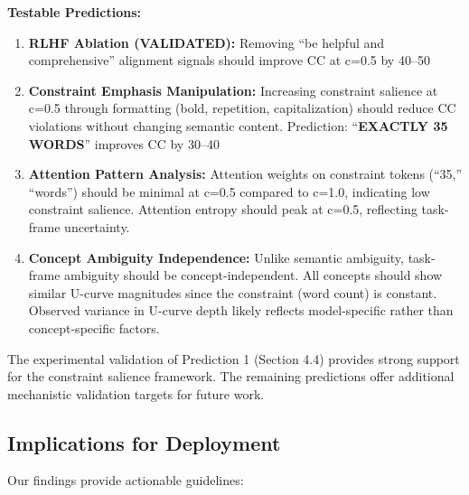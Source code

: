 \documentclass[11pt]{article}
\begin{document}
\textbf{Testable Predictions:}
\begin{enumerate}
\item \textbf{RLHF Ablation (VALIDATED):} Removing ``be helpful and comprehensive'' alignment signals should improve CC at c=0.5 by 40--50%

\item \textbf{Constraint Emphasis Manipulation:} Increasing constraint salience at c=0.5 through formatting (bold, repetition, capitalization) should reduce CC violations without changing semantic content. Prediction: ``\textbf{EXACTLY 35 WORDS}'' improves CC by 30--40%

\item \textbf{Attention Pattern Analysis:} Attention weights on constraint tokens (``35,'' ``words'') should be minimal at c=0.5 compared to c=1.0, indicating low constraint salience. Attention entropy should peak at c=0.5, reflecting task-frame uncertainty.

\item \textbf{Concept Ambiguity Independence:} Unlike semantic ambiguity, task-frame ambiguity should be concept-independent. All concepts should show similar U-curve magnitudes since the constraint (word count) is constant. Observed variance in U-curve depth likely reflects model-specific rather than concept-specific factors.
\end{enumerate}

The experimental validation of Prediction 1 (Section 4.4) provides strong support for the constraint salience framework. The remaining predictions offer additional mechanistic validation targets for future work.

\subsection{Implications for Deployment}

Our findings provide actionable guidelines:
\end{document}
